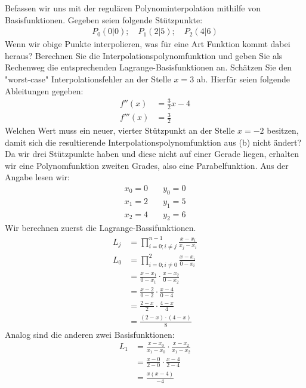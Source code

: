 {
	Befassen wir uns mit der regulären Polynominterpolation mithilfe von Basisfunktionen. Gegeben seien folgende Stützpunkte:
	\begin{align*}
	P_0(0|0); \quad P_1(2|5); \quad P_2(4|6)
	\end{align*}
	}{
		\itemf Wenn wir obige Punkte interpolieren, was für eine Art Funktion kommt dabei heraus?
		\itemf Berechnen Sie die Interpolationspolynomfunktion und geben Sie als Rechenweg die entsprechenden Lagrange-Basisfunktionen an.
		\itemf Schätzen Sie den "worst-case" Interpolationsfehler an der Stelle $x=3$ ab. Hierfür seien folgende Ableitungen gegeben:
		\begin{align*}
			f''(x) &= \frac{3}{2}x - 4 \\
			f'''(x) &= \frac{3}{2}
		\end{align*}
		\itemf Welchen Wert muss ein neuer, vierter Stützpunkt an der Stelle $x=-2$ besitzen, damit sich die resultierende Interpolationspolynomfunktion aus (b) nicht ändert?
	}{
		\itemf Da wir drei Stützpunkte haben und diese nicht auf einer Gerade liegen, erhalten wir eine Polynomfunktion zweiten Grades, also eine Parabelfunktion.
		\itemf Aus der Angabe lesen wir:
		\begin{align*}
			x_0 = 0 &\quad y_0 = 0 \\
			x_1 = 2 &\quad y_1 = 5 \\
			x_2 = 4 &\quad y_2 = 6
		\end{align*}
		Wir berechnen zuerst die Lagrange-Bassifunktionen.
		\begin{align*}
			L_j &= \prod_{i=0; i\ne j}^{n-1} \frac{x-x_i}{x_j-x_i} \\
			L_0 &= \prod_{i=0; i\ne 0}^{2} \frac{x-x_i}{0-x_i} \\
				&= \frac{x-x_1}{0-x_1} \cdot \frac{x-x_2}{0-x_2} \\
				&= \frac{x-2}{0-2} \cdot \frac{x-4}{0-4} \\
				&= \frac{2-x}{2} \cdot \frac{4-x}{4} \\
				&= \frac{(2-x)\cdot(4-x)}{8}
		\end{align*}
		Analog sind die anderen zwei Basisfunktionen:
		\begin{align*}
			L_1 &= \frac{x-x_0}{x_1-x_0} \cdot \frac{x-x_2}{x_1-x_2} \\
				&= \frac{x-0}{2-0} \cdot \frac{x-4}{2-4} \\
				&= \frac{x(x-4)}{-4} \\

\end{align*}}
